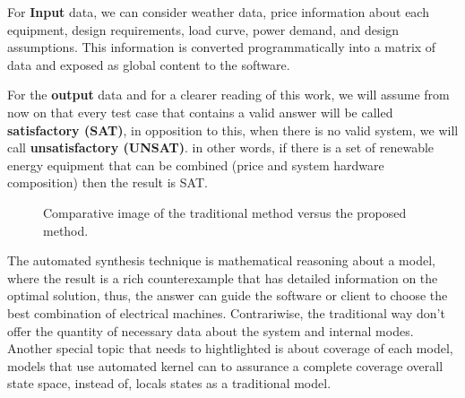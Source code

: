 \documentclass[10pt,journal,compsoc]{IEEEtran}
\begin{document}
For \textbf{Input} data, we can consider weather data, price information about each equipment, design requirements, load curve, power demand, and design assumptions. This information is converted programmatically into a matrix of data and exposed as global content to the software.

For the \textbf{output} data and for a clearer reading of this work, we will assume from now on that every test case that contains a valid answer will be called \textbf{satisfactory (SAT)}, in opposition to this, when there is no valid system, we will call \textbf{unsatisfactory (UNSAT)}. in other words, if there is a set of renewable energy equipment that can be combined (price and system hardware composition) then the result is SAT.

%
\begin{figure}[h]
\centering
\caption{Comparative image of the traditional method versus the proposed method.}
\label{fig:optimization}
\end{figure}

  
The automated synthesis technique is mathematical reasoning about a model, where the result is a rich counterexample that has detailed information on the optimal solution, thus, the answer can guide the software or client to choose the best combination of electrical machines. Contrariwise, the traditional way don't offer the quantity of necessary data about the system and internal modes. Another special topic that needs to hightlighted is about coverage of each model, models that use automated kernel can to assurance a complete coverage overall state space, instead of, locals states as a traditional model. 

\color{black}


\end{document}
